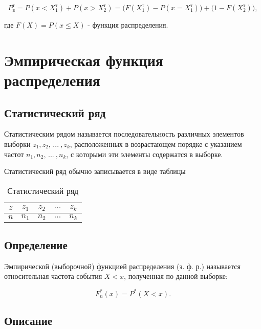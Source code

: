\documentclass{article}
\begin{document}
\begin{equation} \label{eq:probTheorDisc}
    P_\text{в}^\text{т} = P(x < X_1^\text{т}) + P(x > X_2^\text{т}) = \Big(F(X_1^\text{т}) - P(x = X_1^\text{т})\Big) + \Big(1 - F(X_2^\text{т})\Big),
\end{equation}

где $F(X) = P(x \le X)$ - функция распределения.

\section{Эмпирическая функция распределения}

\subsection{Статистический ряд}

Статистическим рядом называется последовательность различных элементов выборки $z_1, z_2, \, ... \: , z_k$, расположенных в возрастающем порядке с указанием частот $n_1, n_2, \, ... \: , n_k$, с которыми эти элементы содержатся в выборке.

Статистический ряд обычно записывается в виде таблицы

\begin{table}[h!]
\begin{center}
\begin{tabular}{|c|c|c|c|c|}
\hline
$z$ & $z_1$ & $z_2$ & $...$ & $z_k$ \\
\hline
$n$ & $n_1$ & $n_2$ & $...$ & $n_k$ \\
\hline
\end{tabular}
\end{center}
\caption{Статистический ряд}
\end{table} 

\subsection{Определение}

Эмпирической (выборочной) функцией распределения (э. ф. р.) называется относительная частота события $X < x$, полученная по данной выборке:

\begin{equation}
    F_n^*(x) = P^*(X < x).
\end{equation}

\subsection{Описание}
\end{document}
